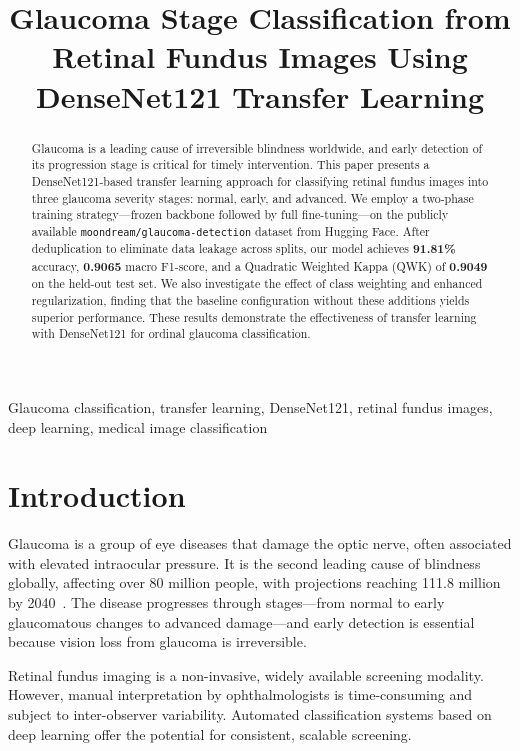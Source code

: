 \documentclass[conference]{IEEEtran}
\title{Glaucoma Stage Classification from Retinal Fundus Images Using DenseNet121 Transfer Learning}
\author{
\IEEEauthorblockN{Group 5}
\IEEEauthorblockA{
Deep Learning Course -- USTH B3 \\
University of Science and Technology of Hanoi \\
2026
}
}
\begin{document}
\maketitle

\begin{abstract}
Glaucoma is a leading cause of irreversible blindness worldwide, and early detection of its progression stage is critical for timely intervention.
This paper presents a DenseNet121-based transfer learning approach for classifying retinal fundus images into three glaucoma severity stages: normal, early, and advanced.
We employ a two-phase training strategy---frozen backbone followed by full fine-tuning---on the publicly available \texttt{moondream/glaucoma-detection} dataset from Hugging Face.
After deduplication to eliminate data leakage across splits, our model achieves \textbf{91.81\%} accuracy, \textbf{0.9065} macro F1-score, and a Quadratic Weighted Kappa (QWK) of \textbf{0.9049} on the held-out test set.
We also investigate the effect of class weighting and enhanced regularization, finding that the baseline configuration without these additions yields superior performance.
These results demonstrate the effectiveness of transfer learning with DenseNet121 for ordinal glaucoma classification.
\end{abstract}

\begin{IEEEkeywords}
Glaucoma classification, transfer learning, DenseNet121, retinal fundus images, deep learning, medical image classification
\end{IEEEkeywords}

\section{Introduction}
\label{sec:intro}

Glaucoma is a group of eye diseases that damage the optic nerve, often associated with elevated intraocular pressure.
It is the second leading cause of blindness globally, affecting over 80 million people, with projections reaching 111.8 million by 2040~\cite{tham2014global}.
The disease progresses through stages---from normal to early glaucomatous changes to advanced damage---and early detection is essential because vision loss from glaucoma is irreversible.

Retinal fundus imaging is a non-invasive, widely available screening modality.
However, manual interpretation by ophthalmologists is time-consuming and subject to inter-observer variability.
Automated classification systems based on deep learning offer the potential for consistent, scalable screening.
\end{document}
